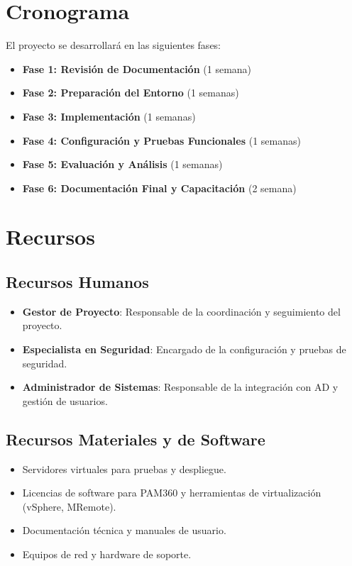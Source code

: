 \section{Cronograma}

El proyecto se desarrollará en las siguientes fases:

\begin{itemize}
	\item \textbf{Fase 1: Revisión de Documentación} (1 semana)
	\item \textbf{Fase 2: Preparación del Entorno} (1 semanas)
	\item \textbf{Fase 3: Implementación} (1 semanas)
	\item \textbf{Fase 4: Configuración y Pruebas Funcionales} (1 semanas)
	\item \textbf{Fase 5: Evaluación y Análisis} (1 semanas)
	\item \textbf{Fase 6: Documentación Final y Capacitación} (2 semana)
\end{itemize}


\section{Recursos}

\subsection{Recursos Humanos}

\begin{itemize}
	\item \textbf{Gestor de Proyecto}: Responsable de la coordinación y seguimiento del proyecto.
	\item \textbf{Especialista en Seguridad}: Encargado de la configuración y pruebas de seguridad.
	\item \textbf{Administrador de Sistemas}: Responsable de la integración con AD y gestión de usuarios.
\end{itemize}

\subsection{Recursos Materiales y de Software}

\begin{itemize}
	\item Servidores virtuales para pruebas y despliegue.
	\item Licencias de software para PAM360 y herramientas de virtualización (vSphere, MRemote).
	\item Documentación técnica y manuales de usuario.
	\item Equipos de red y hardware de soporte.
\end{itemize}


